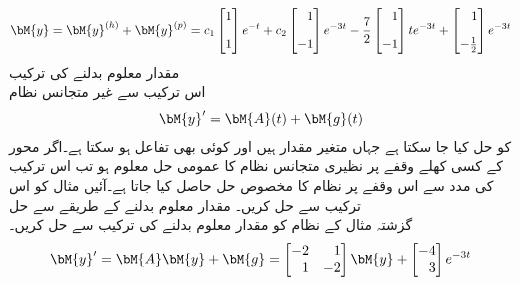  \begin{align}
\bM{y}=\bM{y}^{(h)}+\bM{y}^{(p)}=c_1\begin{bmatrix} 1 \\[1em] 1 \end{bmatrix}e^{-t}+c_2\begin{bmatrix*}[r] 1\\[1em] -1 \end{bmatrix*}e^{-3t}-\frac{7}{2}\begin{bmatrix*}[r] 1\\[1em] -1 \end{bmatrix*}te^{-3t}+\begin{bmatrix*}[r] 1\\[1em]-\frac{1}{2} \end{bmatrix*}e^{-3t}
\end{align}
\quad مقدار معلوم بدلنے کی ترکیب\\
اس ترکیب سے غیر متجانس نظام
\begin{align}\label{مساوات_نظام_غیر_متجانس_مقدار_معلوم_الف}
\bM{y}'=\bM{A}(t)+\bM{g}(t)
\end{align}
کو حل کیا جا سکتا ہے جہاں  متغیر مقدار ہیں اور  کوئی بھی تفاعل ہو سکتا ہے۔اگر  محور کے کسی کھلے وقفے  پر  نظیری متجانس نظام کا عمومی حل  معلوم ہو تب اس ترکیب کی مدد سے اس وقفے پر نظام  کا مخصوص حل  حاصل کیا جاتا ہے۔آئیں مثال  کو اس ترکیب سے حل کریں۔
\quad مقدار معلوم بدلنے کے طریقے سے حل\\
گزشتہ مثال کے نظام  کو مقدار معلوم بدلنے کی ترکیب سے حل کریں۔
\begin{align}
\bM{y}'=\bM{A}\bM{y}+\bM{g}=\begin{bmatrix*}[r] -2&1\\1&-2 \end{bmatrix*} \bM{y}+\begin{bmatrix*}[r] -4\\3 \end{bmatrix*} e^{-3t}
\end{align}

